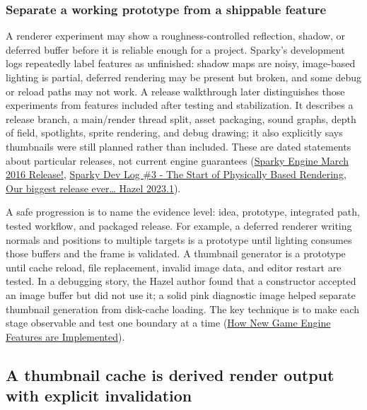 \subsubsection{Separate a working prototype from a shippable feature}\label{06-engine-ii-ch041-separate-a-working-prototype-from-a-shippable-feature}

\hypertarget{06-engine-ii-ch041-separate-a-working-prototype-from-a-shippable-feature}{}

A renderer experiment may show a roughness-controlled reflection, shadow, or deferred buffer before it is reliable enough for a project. Sparky's development logs repeatedly label features as unfinished: shadow maps are noisy, image-based lighting is partial, deferred rendering may be present but broken, and some debug or reload paths may not work. A release walkthrough later distinguishes those experiments from features included after testing and stabilization. It describes a release branch, a main/render thread split, asset packaging, sound graphs, depth of field, spotlights, sprite rendering, and debug drawing; it also explicitly says thumbnails were still planned rather than included. These are dated statements about particular releases, not current engine guarantees (\href{https://www.youtube.com/watch?v=o4_tPhgslcU&t=4m34s}{Sparky Engine March 2016 Release!}, \href{https://www.youtube.com/watch?v=YRd2F1JDGlg&t=0m8s}{Sparky Dev Log \#3 - The Start of Physically Based Rendering}, \href{https://www.youtube.com/watch?v=L_XLGmG2Ct8&t=0m1s}{Our biggest release ever\ldots{} Hazel 2023.1}).

A safe progression is to name the evidence level: idea, prototype, integrated path, tested workflow, and packaged release. For example, a deferred renderer writing normals and positions to multiple targets is a prototype until lighting consumes those buffers and the frame is validated. A thumbnail generator is a prototype until cache reload, file replacement, invalid image data, and editor restart are tested. In a debugging story, the Hazel author found that a constructor accepted an image buffer but did not use it; a solid pink diagnostic image helped separate thumbnail generation from disk-cache loading. The key technique is to make each stage observable and test one boundary at a time (\href{https://www.youtube.com/watch?v=z1O6AZWuWm4&t=13m56s}{How New Game Engine Features are Implemented}).

\subsection{A thumbnail cache is derived render output with explicit invalidation}\label{06-engine-ii-ch041-a-thumbnail-cache-is-derived-render-output-with-explicit-invalidation}

